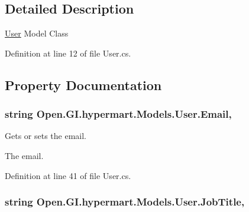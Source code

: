 \subsection{Detailed Description}
\hyperlink{class_open_1_1_g_i_1_1hypermart_1_1_models_1_1_user}{User} Model Class 



Definition at line 12 of file User.\+cs.



\subsection{Property Documentation}
\hypertarget{class_open_1_1_g_i_1_1hypermart_1_1_models_1_1_user_a7b16ff0fd873d16ef921cd94f89be6f5}{}
\subsubsection[{Email}]{\setlength{\rightskip}{0pt plus 5cm}string Open.\+G\+I.\+hypermart.\+Models.\+User.\+Email\hspace{0.3cm}{\ttfamily [get]}, {\ttfamily [set]}}\label{class_open_1_1_g_i_1_1hypermart_1_1_models_1_1_user_a7b16ff0fd873d16ef921cd94f89be6f5}


Gets or sets the email. 

The email. 

Definition at line 41 of file User.\+cs.

\hypertarget{class_open_1_1_g_i_1_1hypermart_1_1_models_1_1_user_ad0aa7cba72b233858607496eb693d149}{}
\subsubsection[{Job\+Title}]{\setlength{\rightskip}{0pt plus 5cm}string Open.\+G\+I.\+hypermart.\+Models.\+User.\+Job\+Title\hspace{0.3cm}{\ttfamily [get]}, {\ttfamily [set]}}\label{class_open_1_1_g_i_1_1hypermart_1_1_models_1_1_user_ad0aa7cba72b233858607496eb693d149}


